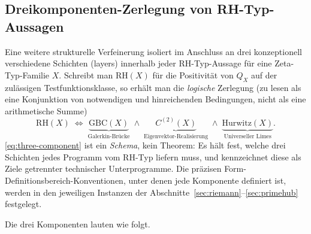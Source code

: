 \documentclass[11pt]{article}
\theoremstyle{definition}
\theoremstyle{remark}
\begin{document}
\subsection{Dreikomponenten-Zerlegung von RH-Typ-Aussagen}
\label{sec:three-component}

Eine weitere strukturelle Verfeinerung isoliert im Anschluss an
\cite{MetaGalerkinBridge} drei konzeptionell verschiedene
Schichten (layers) innerhalb jeder RH-Typ-Aussage für eine Zeta-Typ-Familie $X$.
Schreibt man $\mathrm{RH}(X)$ für die Positivität von $Q_X$ auf der
zulässigen Testfunktionsklasse, so erhält man die \emph{logische}
Zerlegung (zu lesen als eine Konjunktion von notwendigen und hinreichenden
Bedingungen, nicht als eine arithmetische Summe)
\begin{equation}
\label{eq:three-component}
  \mathrm{RH}(X)
  \;\Longleftrightarrow\;
  \underbrace{\mathrm{GBC}(X)}_{\text{Galerkin-Brücke}}
  \;\wedge\;
  \underbrace{C^{(2)}(X)}_{\text{Eigenvektor-Realisierung}}
  \;\wedge\;
  \underbrace{\mathrm{Hurwitz}(X)}_{\text{Universeller Limes}}.
\end{equation}
\eqref{eq:three-component} ist ein \emph{Schema}, kein Theorem: Es
hält fest, welche drei Schichten jedes Programm vom RH-Typ liefern muss,
und kennzeichnet diese als Ziele getrennter technischer Unterprogramme.
Die präzisen Form-Definitionsbereich-Konventionen, unter denen jede Komponente
definiert ist, werden in den jeweiligen Instanzen der
Abschnitte~\ref{sec:riemann}--\ref{sec:primehub} festgelegt.

Die drei Komponenten lauten wie folgt.
\end{document}
